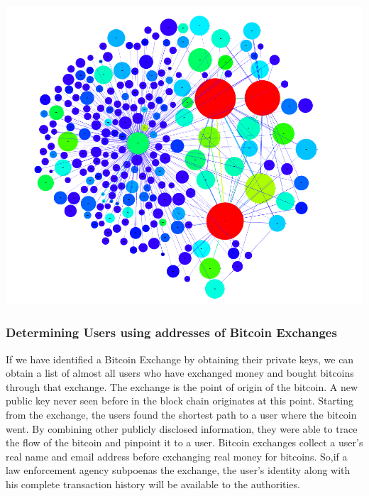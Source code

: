 \begin{center}
\includegraphics[scale=0.5]{images/wiki.png}
\end{center}

\subsubsection{Determining Users using addresses of Bitcoin Exchanges}
If we have identified a Bitcoin Exchange by obtaining their private keys, we can obtain a list of almost all users who have exchanged money and bought bitcoins through that exchange. The exchange is the point of origin of the bitcoin. A new public key never seen before in the block chain originates at this point. Starting from the exchange, the users found the shortest path to a user where the bitcoin went. By combining other publicly disclosed information, they were able to trace the flow of the bitcoin and pinpoint it to a user. Bitcoin exchanges collect a user’s real name and email address before exchanging real money for bitcoins. So,if a law enforcement agency subpoenas the exchange, the user’s identity along with his complete transaction history will be available to the authorities.